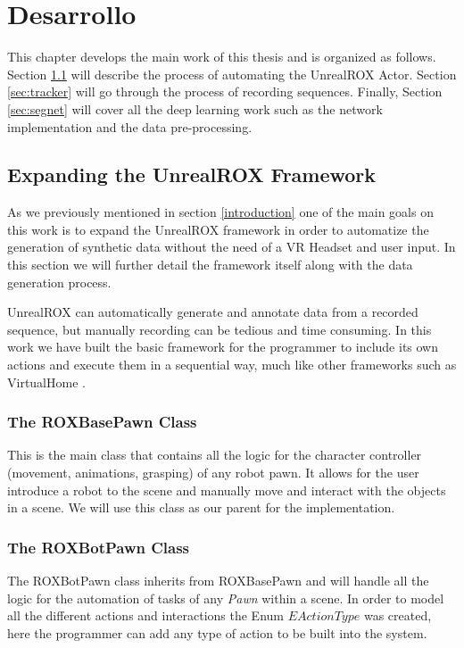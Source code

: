 
\chapter{Desarrollo}
\label{desarrollo}
This chapter develops the main work of this thesis and is organized as follows. Section \ref{sec:expanding} will describe the process of automating the UnrealROX Actor. Section \ref{sec:tracker} will go through the process of recording sequences. Finally, Section \ref{sec:segnet} will cover all the deep learning work such as the network implementation and the data pre-processing.  

\section{Expanding the UnrealROX Framework}
\label{sec:expanding}
As we previously mentioned in section \ref{introduction} one of the main goals on this work is to expand the UnrealROX framework in order to automatize the generation of synthetic data without the need of a VR Headset and user input. In this section we will further detail the framework itself along with the data generation process.

UnrealROX can automatically generate and annotate data from a recorded sequence, but manually recording can be tedious and time consuming. In this work we have built the basic framework for the programmer to include its own actions and execute them in a sequential way, much like other frameworks such as VirtualHome \cite{virtualhome2018}. 

\subsection{The ROXBasePawn Class}
This is the main class that contains all the logic for the character controller (movement, animations, grasping) of any robot pawn. It allows for the user introduce a robot to the scene and manually move and interact with the objects in a scene. We will use this class as our parent for the implementation.

\subsection{The ROXBotPawn Class}
The ROXBotPawn class inherits from ROXBasePawn and will handle all the logic for the automation of tasks of any \textit{Pawn} within a scene. In order to model all the different actions and interactions the Enum $EActionType$ was created, here the programmer can add any type of action to be built into the system.

